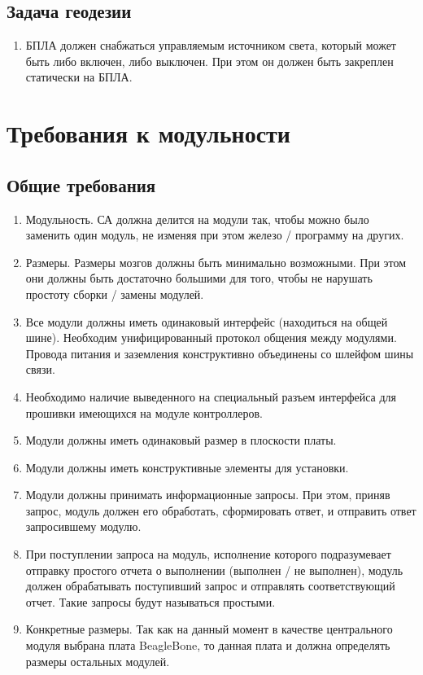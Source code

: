 \documentclass[utf8]{report}
\begin{document}
\subsection{Задача геодезии}
\begin{enumerate}
  \item БПЛА должен снабжаться управляемым источником света, который может быть либо включен, либо выключен. При этом он должен быть закреплен статически на БПЛА.
\end{enumerate}

\section{Требования к модульности}

\subsection{Общие требования}
\begin{enumerate}
  \item Модульность. СА должна делится на модули так, чтобы можно было заменить один модуль, не изменяя при этом железо / программу на других.
  \item Размеры. Размеры мозгов должны быть минимально возможными. При этом они должны быть достаточно большими для того, чтобы не нарушать простоту сборки / замены модулей.
  \item Все модули должны иметь одинаковый интерфейс (находиться на общей шине). Необходим унифицированный протокол общения между модулями. Провода питания и заземления конструктивно объединены со шлейфом шины связи.
  \item Необходимо наличие выведенного на специальный разъем интерфейса для прошивки имеющихся на модуле контроллеров.
  \item Модули должны иметь одинаковый размер в плоскости платы.
  \item Модули должны иметь конструктивные элементы для установки.
  \item Модули должны принимать информационные запросы. При этом, приняв запрос, модуль должен его обработать, сформировать ответ, и отправить ответ запросившему модулю.
  \item При поступлении запроса на модуль, исполнение которого подразумевает отправку простого отчета о выполнении (выполнен / не выполнен), модуль должен обрабатывать поступивший запрос и отправлять соответствующий отчет. Такие запросы будут называться простыми.
  \item Конкретные размеры. Так как на данный момент в качестве центрального модуля выбрана плата BeagleBone, то данная плата и должна определять размеры остальных модулей.
\end{enumerate}
\end{document}
